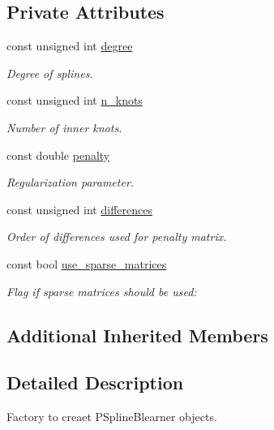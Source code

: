 \subsection*{Private Attributes}
\begin{DoxyCompactItemize}
\item 
const unsigned int \hyperlink{classblearnerfactory_1_1_p_spline_blearner_factory_a8cfdf9e919e6392b2cba293dd5d931d5}{degree}
\begin{DoxyCompactList}\small\item\em Degree of splines. \end{DoxyCompactList}\item 
const unsigned int \hyperlink{classblearnerfactory_1_1_p_spline_blearner_factory_aa2fbd861eba158d220ecf96ddd1b50c5}{n\+\_\+knots}
\begin{DoxyCompactList}\small\item\em Number of inner knots. \end{DoxyCompactList}\item 
const double \hyperlink{classblearnerfactory_1_1_p_spline_blearner_factory_ae5bfe83b154898ad6cff26d56a82f540}{penalty}
\begin{DoxyCompactList}\small\item\em Regularization parameter. \end{DoxyCompactList}\item 
const unsigned int \hyperlink{classblearnerfactory_1_1_p_spline_blearner_factory_ae309d500aebc2abea96a639e431a3fb3}{differences}
\begin{DoxyCompactList}\small\item\em Order of differences used for penalty matrix. \end{DoxyCompactList}\item 
const bool \hyperlink{classblearnerfactory_1_1_p_spline_blearner_factory_a5c2cfba00d48a4b85af6f1ecd714c6a1}{use\+\_\+sparse\+\_\+matrices}
\begin{DoxyCompactList}\small\item\em Flag if sparse matrices should be used\+: \end{DoxyCompactList}\end{DoxyCompactItemize}
\subsection*{Additional Inherited Members}


\subsection{Detailed Description}
Factory to creaet {\ttfamily P\+Spline\+Blearner} objects. 

